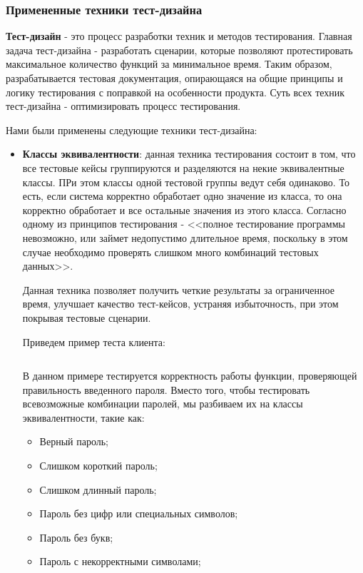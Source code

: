 \documentclass[a4paper, 14pt]{article}
\begin{document}
\subsubsection{Примененные техники тест-дизайна}

\textbf{Тест-дизайн} - это процесс разработки техник и методов тестирования. Главная задача тест-дизайна - разработать сценарии, которые позволяют протестировать максимальное количество функций за минимальное время. Таким образом, разрабатывается тестовая документация, опирающаяся на общие принципы и логику тестирования с поправкой на особенности продукта. Суть всех техник тест-дизайна - оптимизировать процесс тестирования.

Нами были применены следующие техники тест-дизайна:

\begin{itemize}
    \item \textbf{Классы эквивалентности}: данная техника тестирования состоит в том, что все тестовые кейсы группируются и разделяются на некие эквивалентные классы. ПРи этом классы одной тестовой группы ведут себя одинаково. То есть, если система корректно обработает одно значение из класса, то она корректно обработает и все остальные значения из этого класса. Согласно одному из принципов тестирования - <<полное тестирование программы невозможно, или займет недопустимо длительное время, поскольку в этом случае необходимо проверять слишком много комбинаций тестовых данных>>.

    Данная техника позволяет получить четкие результаты за ограниченное время, улучшает качество тест-кейсов, устраняя избыточность, при этом покрывая тестовые сценарии.

    Приведем пример теста клиента:
    \normalsize
    \inputminted[frame=single]{Kotlin}{./code/1.kt}
    \large
    В данном примере тестируется корректность работы функции, проверяющей правильность введенного пароля. Вместо того, чтобы тестировать всевозможные комбинации паролей, мы разбиваем их на классы эквивалентности, такие как:
    \begin{itemize}
        \item Верный пароль;
        \item Слишком короткий пароль;
        \item Слишком длинный пароль;
        \item Пароль без цифр или специальных символов;
        \item Пароль без букв;
        \item Пароль с некорректными символами;
    \end{itemize}


\end{itemize}
\end{document}
